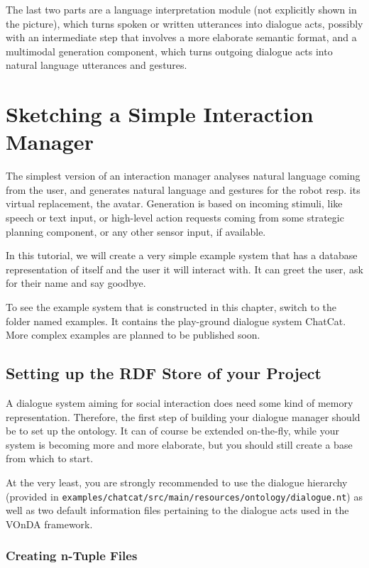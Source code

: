 \documentclass[a4paper]{report}
\newcommand{\vonda}{VOnDA\xspace}
\begin{document}
The last two parts are a language interpretation module (not
explicitly shown in the picture), which turns spoken or written utterances
into dialogue acts, possibly with an intermediate step that involves a more
elaborate semantic format, and a multimodal generation component, which turns
outgoing dialogue acts into natural language utterances and gestures.

\chapter{Sketching a Simple Interaction Manager}

The simplest version of an interaction manager analyses natural language
coming from the user, and generates natural language and gestures for the robot
resp. its virtual replacement, the avatar. Generation is based on incoming
stimuli, like speech or text input, or high-level action requests coming from
some strategic planning component, or any other sensor input, if available.

In this tutorial, we will create a very simple example system that has a
database representation of itself and the user it will interact with. It can
greet the user, ask for their name and say goodbye.

To see the example system that is constructed in this chapter, switch to the
folder named examples. It contains the play-ground dialogue system
ChatCat. More complex examples are planned to be published soon.

\section{Setting up the RDF Store of your Project} \label{sec:example-hfc}

A dialogue system aiming for social interaction does need some kind of memory
representation. Therefore, the first step of building your dialogue manager
should be to set up the ontology. It can of course be extended on-the-fly,
while your system is becoming more and more elaborate, but you should still
create a base from which to start.

At the very least, you are strongly recommended to use the dialogue hierarchy
(provided in \texttt{examples/chatcat/src/main/resources/ontology/dialogue.nt})
as well as two default information files pertaining to the dialogue acts used
in the \vonda framework.

\subsection{Creating n-Tuple Files}
\end{document}
